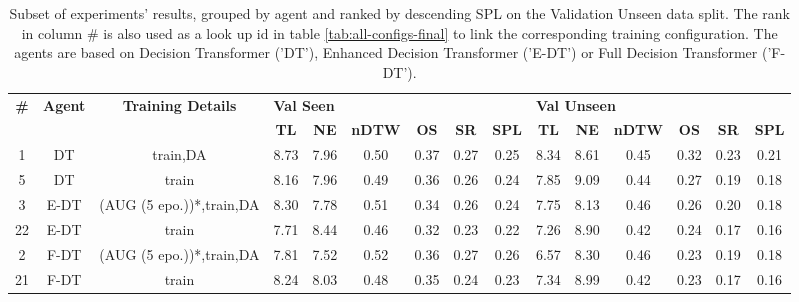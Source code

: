 \begin{table}
\centering
\caption{\label{tab:final}Subset of experiments' results, grouped by agent and ranked by descending SPL on the Validation Unseen data split. The rank in column \# is also used as a look up id in table \ref{tab:all-configs-final} to link the corresponding training configuration.     \newline The agents are based on Decision Transformer ('DT'), Enhanced Decision Transformer ('E-DT') or Full Decision Transformer ('F-DT').}
\begin{tabular}{@{\hskip3pt}c@{\hskip3pt}c@{\hskip3pt}c@{\hskip3pt}c@{\hskip3pt}c@{\hskip3pt}c@{\hskip3pt}c@{\hskip3pt}c@{\hskip3pt}c@{\hskip3pt}c@{\hskip3pt}c@{\hskip3pt}c@{\hskip3pt}c@{\hskip3pt}c@{\hskip3pt}c}
\toprule
\textbf{\#} & \textbf{Agent} & \textbf{Training Details} & \multicolumn{6}{l}{\textbf{Val Seen}} & \multicolumn{6}{l}{\textbf{Val Unseen}} \\
 \textbf{~} &     \textbf{~} &                \textbf{~} &       \textbf{TL} & \textbf{NE} & \textbf{nDTW} & \textbf{OS} & \textbf{SR} & \textbf{SPL} &         \textbf{TL} & \textbf{NE} & \textbf{nDTW} & \textbf{OS} & \textbf{SR} & \textbf{SPL} \\
\midrule
          1 &             DT &                  train,DA &              8.73 &        7.96 &          0.50 &        0.37 &        0.27 &         0.25 &                8.34 &        8.61 &          0.45 &        0.32 &        0.23 &         0.21 \\
          5 &             DT &                     train &              8.16 &        7.96 &          0.49 &        0.36 &        0.26 &         0.24 &                7.85 &        9.09 &          0.44 &        0.27 &        0.19 &         0.18 \\
          3 &           E-DT &  (AUG (5 epo.))*,train,DA &              8.30 &        7.78 &          0.51 &        0.34 &        0.26 &         0.24 &                7.75 &        8.13 &          0.46 &        0.26 &        0.20 &         0.18 \\
         22 &           E-DT &                     train &              7.71 &        8.44 &          0.46 &        0.32 &        0.23 &         0.22 &                7.26 &        8.90 &          0.42 &        0.24 &        0.17 &         0.16 \\
          2 &           F-DT &  (AUG (5 epo.))*,train,DA &              7.81 &        7.52 &          0.52 &        0.36 &        0.27 &         0.26 &                6.57 &        8.30 &          0.46 &        0.23 &        0.19 &         0.18 \\
         21 &           F-DT &                     train &              8.24 &        8.03 &          0.48 &        0.35 &        0.24 &         0.23 &                7.34 &        8.99 &          0.42 &        0.23 &        0.17 &         0.16 \\
\bottomrule
\end{tabular}
\end{table}
